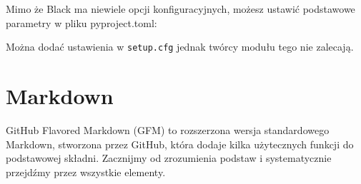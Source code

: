 \documentclass[
  polish,
  letterpaper,
  DIV=11,
  numbers=noendperiod]{scrreprt}
\newenvironment{Shaded}{\begin{snugshade}}{\end{snugshade}}
\newcommand{\DataTypeTok}[1]{\textcolor[rgb]{0.68,0.00,0.00}{#1}}
\newcommand{\DecValTok}[1]{\textcolor[rgb]{0.68,0.00,0.00}{#1}}
\newcommand{\KeywordTok}[1]{\textcolor[rgb]{0.00,0.23,0.31}{\textbf{#1}}}
\newcommand{\NormalTok}[1]{\textcolor[rgb]{0.00,0.23,0.31}{#1}}
\newcommand{\OperatorTok}[1]{\textcolor[rgb]{0.37,0.37,0.37}{#1}}
\newcommand{\StringTok}[1]{\textcolor[rgb]{0.13,0.47,0.30}{#1}}
\newcommand{\VerbatimStringTok}[1]{\textcolor[rgb]{0.13,0.47,0.30}{#1}}
\begin{document}
Mimo że Black ma niewiele opcji konfiguracyjnych, możesz ustawić
podstawowe parametry w pliku pyproject.toml:

\begin{Shaded}
\end{Shaded}

Można dodać ustawienia w \texttt{setup.cfg} jednak twórcy modułu tego
nie zalecają.

\begin{Shaded}
\end{Shaded}

\chapter{Markdown}\label{markdown}

GitHub Flavored Markdown (GFM) to rozszerzona wersja standardowego
Markdown, stworzona przez GitHub, która dodaje kilka użytecznych funkcji
do podstawowej składni. Zacznijmy od zrozumienia podstaw i
systematycznie przejdźmy przez wszystkie elementy.
\end{document}
